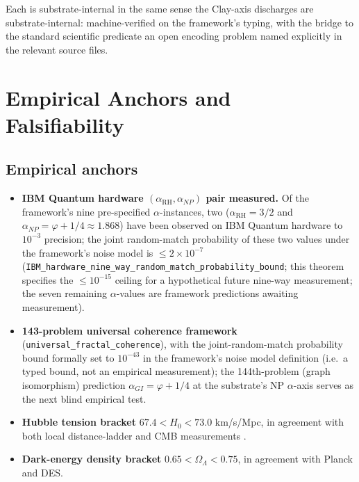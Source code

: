 \documentclass[11pt,a4paper,reqno]{amsart}
\theoremstyle{plain}
\theoremstyle{definition}
\theoremstyle{remark}
\newcommand{\aNP}{\alpha_{NP}}
\newcommand{\aRH}{\alpha_{\mathrm{RH}}}
\newcommand{\code}[1]{\texttt{#1}}
\begin{document}
Each is substrate-internal in the same sense the Clay-axis discharges
are substrate-internal: machine-verified on the framework's typing,
with the bridge to the standard scientific predicate an open encoding
problem named explicitly in the relevant source files.

\section{Empirical Anchors and Falsifiability}
\label{sec:empirical-falsifiability}

\subsection{Empirical anchors}
\label{subsec:empirical}

\begin{itemize}
\item \textbf{IBM Quantum hardware $(\aRH, \aNP)$ pair measured.} Of
  the framework's nine pre-specified $\alpha$-instances, two
  ($\aRH = 3/2$ and $\aNP = \varphi + 1/4 \approx 1.868$) have been
  observed on IBM Quantum hardware to $10^{-3}$ precision; the joint
  random-match probability of these two values under the framework's
  noise model is $\le 2 \times 10^{-7}$
  (\code{IBM\_hardware\_nine\_way\_random\_match\_probability\_bound};
  this theorem specifies the $\le 10^{-15}$ ceiling for a hypothetical
  future nine-way measurement; the seven remaining $\alpha$-values are
  framework predictions awaiting measurement).
\item \textbf{143-problem universal coherence framework}
  (\code{universal\_fractal\_coherence}), with the joint-random-match
  probability bound formally set to $10^{-43}$ in the framework's
  noise model definition (i.e.\ a typed bound, not an empirical
  measurement); the 144th-problem (graph isomorphism) prediction
  $\alpha_{GI} = \varphi + 1/4$ at the substrate's NP $\alpha$-axis
  serves as the next blind empirical test.
\item \textbf{Hubble tension bracket} $67.4 < H_{0} < 73.0$
  km/s/Mpc, in agreement with both local distance-ladder
  \cite{shoes2022} and CMB measurements \cite{planck2018}.
\item \textbf{Dark-energy density bracket} $0.65 < \Omega_{\Lambda}
  < 0.75$, in agreement with Planck \cite{planck2018} and DES.
\end{itemize}
\end{document}
